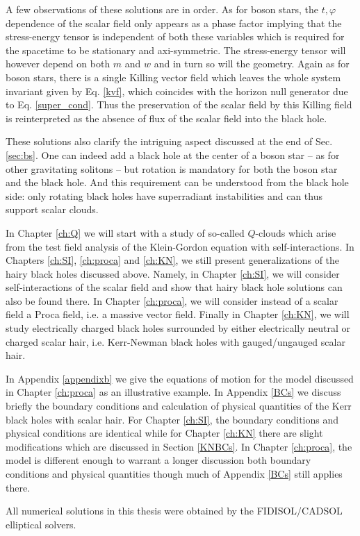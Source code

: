 A few observations of these solutions are in order.
As for boson stars, the $t,\varphi$ dependence of the scalar field only appears as a phase factor implying that the stress-energy tensor is independent of both these variables which is required for the spacetime to be stationary and axi-symmetric.
The stress-energy tensor will however depend on both $m$ and $w$ and in turn so will the geometry.
Again as for boson stars, there is a single Killing vector field which leaves the whole system invariant given by Eq. \eqref{kvf},
which coincides with the horizon null generator due to Eq. \eqref{super_cond}.
Thus the preservation of the scalar field by this Killing field is reinterpreted as the absence of flux of the scalar field into the black hole.

These solutions also clarify the intriguing aspect discussed at the end of Sec. \ref{sec:bs}.
One can indeed add a black hole at the center of a boson star -- as for other gravitating solitons -- but rotation is mandatory for both the boson star and the black hole.
And this requirement can be understood from the black hole side: only rotating black holes have superradiant instabilities and can thus support scalar clouds. 

In Chapter \ref{ch:Q} we will start with a study of so-called $Q$-clouds which arise from the test field analysis of the Klein-Gordon equation with self-interactions.
In Chapters \ref{ch:SI}, \ref{ch:proca} and \ref{ch:KN}, we still present generalizations of the hairy black holes discussed above.
Namely, in Chapter \ref{ch:SI}, we will consider self-interactions of the scalar field and show that hairy black hole solutions can also be found there.
In Chapter \ref{ch:proca}, we will consider instead of a scalar field a Proca field, i.e. a massive vector field.
Finally in Chapter \ref{ch:KN}, we will study electrically charged black holes surrounded by either electrically neutral or charged scalar hair, i.e. Kerr-Newman black holes with gauged/ungauged scalar hair.

In Appendix \ref{appendixb} we give the equations of motion for the model discussed in Chapter \ref{ch:proca} as an illustrative example.
In Appendix \ref{BCs} we discuss briefly the boundary conditions and calculation of physical quantities of the Kerr black holes with scalar hair.
For Chapter \ref{ch:SI}, the boundary conditions and physical conditions are identical while for Chapter \ref{ch:KN} there are slight modifications which are discussed in Section \ref{KNBCs}.
In Chapter \ref{ch:proca}, the model is different enough to warrant a longer discussion both boundary conditions and physical quantities though much of Appendix \ref{BCs} still applies there.

All numerical solutions in this thesis were obtained by the FIDISOL/CADSOL elliptical solvers\cite{schoen}.

